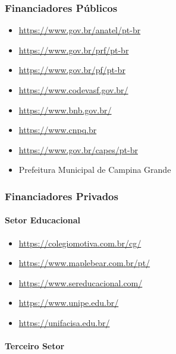 \subsubsection{Financiadores Públicos}

\begin{itemize}
\item \href{https://www.gov.br/anatel/pt-br}{https://www.gov.br/anatel/pt-br}
\item \href{https://www.gov.br/prf/pt-br}{https://www.gov.br/prf/pt-br}
\item \href{https://www.gov.br/pf/pt-br}{https://www.gov.br/pf/pt-br}
\item \href{https://www.codevasf.gov.br/}{https://www.codevasf.gov.br/}
\item \href{https://www.bnb.gov.br/}{https://www.bnb.gov.br/}
\item \url{https://www.cnpq.br}
\item \href{https://www.gov.br/capes/pt-br}{https://www.gov.br/capes/pt-br}
\item Prefeitura Municipal de Campina Grande
\end{itemize}

\subsubsection{Financiadores Privados}

\paragraph{Setor Educacional}

\begin{itemize}
\item \href{https://colegiomotiva.com.br/cg/}{https://colegiomotiva.com.br/cg/}
\item \href{https://www.maplebear.com.br/pt/}{https://www.maplebear.com.br/pt/}
\item \href{https://www.sereducacional.com/}{https://www.sereducacional.com/}
\item \href{https://www.unipe.edu.br/}{https://www.unipe.edu.br/}
\item \href{https://unifacisa.edu.br/}{https://unifacisa.edu.br/}
\end{itemize}

\paragraph{Terceiro Setor}

